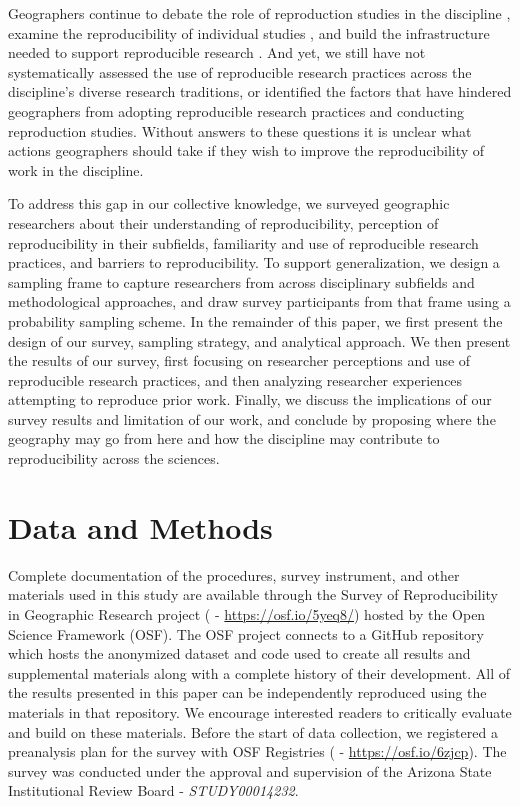 \documentclass[]{interact}
\theoremstyle{plain}%
\theoremstyle{definition}
\theoremstyle{remark}
\begin{document}
Geographers continue to debate the role of reproduction studies in the discipline \citep{brunsdon2016, goodchild2021Annals, kedron2022replication, kedron2021IJGIS, singleton2016, sui2021, Wainwright2021}, examine the reproducibility of individual studies \citep{Nust_AGILE_2022, ostermann2021}, and build the infrastructure needed to support reproducible research \citep{nust2019, wilson2021, yin2019cybergis, Kedron_Holler_Bardin_Hilgendorf_2022}. 
And yet, we still have not systematically assessed the use of reproducible research practices across the discipline's diverse research traditions, or identified the factors that have hindered geographers from adopting reproducible research practices and conducting reproduction studies. 
Without answers to these questions it is unclear what actions geographers should take if they wish to improve the reproducibility of work in the discipline.

To address this gap in our collective knowledge, we surveyed geographic researchers about their understanding of reproducibility, perception of reproducibility in their subfields, familiarity and use of reproducible research practices, and barriers to reproducibility.
To support generalization, we design a sampling frame to capture researchers from across disciplinary subfields and methodological approaches, and draw survey participants from that frame using a probability sampling scheme.
In the remainder of this paper, we first present the design of our survey, sampling strategy, and analytical approach. 
We then present the results of our survey, first focusing on researcher perceptions and use of reproducible research practices, and then analyzing researcher experiences attempting to reproduce prior work. 
Finally, we discuss the implications of our survey results and limitation of our work, and conclude by proposing where the geography may go from here and how the discipline may contribute to reproducibility across the sciences. 


\section*{Data and Methods}
Complete documentation of the procedures, survey instrument, and other materials used in this study are available through the Survey of Reproducibility in Geographic Research project (\citet{Kedron_Holler_Bardin_Hilgendorf_2022} - \url{https://osf.io/5yeq8/}) hosted by the Open Science Framework (OSF).
The OSF project connects to a GitHub repository which hosts the anonymized dataset and code used to create all results and supplemental materials along with a complete history of their development. 
All of the results presented in this paper can be independently reproduced using the materials in that repository.
We encourage interested readers to critically evaluate and build on these materials.
Before the start of data collection, we registered a preanalysis plan for the survey with OSF Registries (\citet{Kedron_Survey_PAP} - \url{https://osf.io/6zjcp}). 
The survey was conducted under the approval and supervision of the Arizona State Institutional Review Board - \textit{STUDY00014232}.
\end{document}
